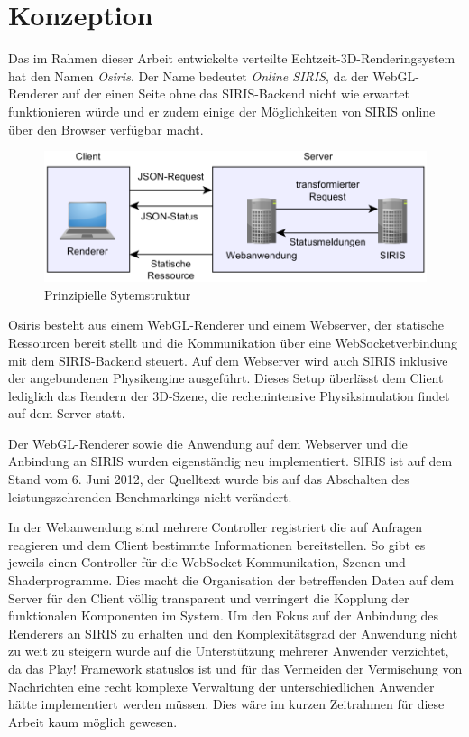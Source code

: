 \chapter{Konzeption}
\label{chap:konzeption}
Das im Rahmen dieser Arbeit entwickelte verteilte Echtzeit-3D-Renderingsystem hat den Namen \textit{Osiris}. Der Name bedeutet \textit{Online SIRIS}, da der WebGL-Renderer auf der einen Seite ohne das SIRIS-Backend nicht wie erwartet funktionieren würde und er zudem einige der Möglichkeiten von SIRIS online über den Browser verfügbar macht.
\begin{figure}
\centering
\includegraphics[width=\textwidth]{bilder/structure.png}
\caption{Prinzipielle Sytemstruktur}
\label{fig:structure}
\end{figure}
Osiris besteht aus einem WebGL-Renderer und einem Webserver, der statische Ressourcen bereit stellt und die Kommunikation über eine WebSocketverbindung mit dem SIRIS-Backend steuert. Auf dem Webserver wird auch SIRIS inklusive der angebundenen Physikengine ausgeführt. Dieses Setup überlässt dem Client lediglich das Rendern der 3D-Szene, die rechenintensive Physiksimulation findet auf dem Server statt.

Der WebGL-Renderer sowie die Anwendung auf dem Webserver und die Anbindung an SIRIS wurden eigenständig neu implementiert. SIRIS ist auf dem Stand vom 6. Juni 2012, der Quelltext wurde bis auf das Abschalten des leistungszehrenden Benchmarkings nicht verändert.

In der Webanwendung sind mehrere Controller registriert die auf Anfragen reagieren und dem Client bestimmte Informationen bereitstellen. So gibt es jeweils einen Controller für die WebSocket-Kommunikation, Szenen und Shaderprogramme. Dies macht die Organisation der betreffenden Daten auf dem Server für den Client völlig transparent und verringert die Kopplung der funktionalen Komponenten im System. Um den Fokus auf der Anbindung des Renderers an SIRIS zu erhalten und den Komplexitätsgrad der Anwendung nicht zu weit zu steigern wurde auf die Unterstützung mehrerer Anwender verzichtet, da das Play! Framework statuslos ist und für das Vermeiden der Vermischung von Nachrichten eine recht komplexe Verwaltung der unterschiedlichen Anwender hätte implementiert werden müssen. Dies wäre im kurzen Zeitrahmen für diese Arbeit kaum möglich gewesen.

